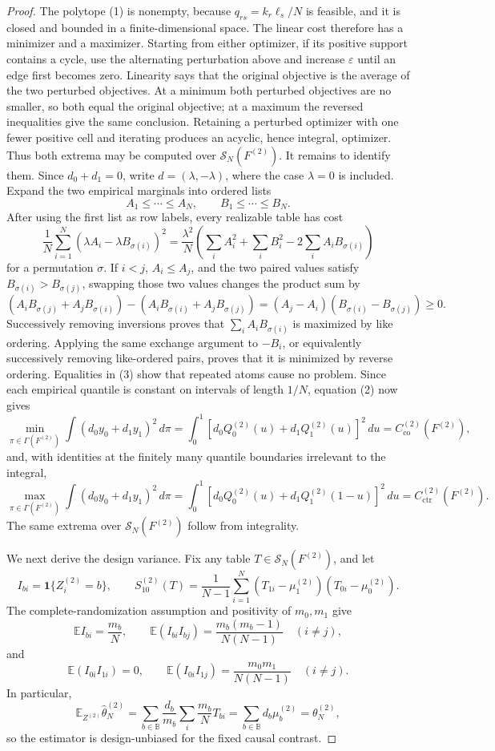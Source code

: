 \documentclass{article}
\begin{document}
\begin{proof}
The polytope (1) is nonempty, because \(q_{rs}=k_r\ell_s/N\) is feasible, and it is closed and bounded in a finite-dimensional space.  The linear cost therefore has a minimizer and a maximizer.  Starting from either optimizer, if its positive support contains a cycle, use the alternating perturbation above and increase \(\varepsilon\) until an edge first becomes zero.  Linearity says that the original objective is the average of the two perturbed objectives.  At a minimum both perturbed objectives are no smaller, so both equal the original objective; at a maximum the reversed inequalities give the same conclusion.  Retaining a perturbed optimizer with one fewer positive cell and iterating produces an acyclic, hence integral, optimizer.  Thus both extrema may be computed over \(\mathcal S_N(F^{(2)})\).  It remains to identify them.  Since \(d_0+d_1=0\), write \(d=(\lambda,-\lambda)\), where the case \(\lambda=0\) is included.  Expand the two empirical marginals into ordered lists
\[
A_1\leq\cdots\leq A_N,\qquad B_1\leq\cdots\leq B_N.
\]
After using the first list as row labels, every realizable table has cost
\[
\frac1N\sum_{i=1}^N(\lambda A_i-\lambda B_{\sigma(i)})^2
=\frac{\lambda^2}{N}\left(\sum_i A_i^2+\sum_iB_i^2-2\sum_iA_iB_{\sigma(i)}\right) \tag{2}
\]
for a permutation \(\sigma\).  If \(i<j\), \(A_i\leq A_j\), and the two paired values satisfy \(B_{\sigma(i)}>B_{\sigma(j)}\), swapping those two values changes the product sum by
\[
(A_iB_{\sigma(j)}+A_jB_{\sigma(i)})
 -(A_iB_{\sigma(i)}+A_jB_{\sigma(j)})
=(A_j-A_i)(B_{\sigma(i)}-B_{\sigma(j)})\geq0. \tag{3}
\]
Successively removing inversions proves that \(\sum_iA_iB_{\sigma(i)}\) is maximized by like ordering.  Applying the same exchange argument to \(-B_i\), or equivalently successively removing like-ordered pairs, proves that it is minimized by reverse ordering.  Equalities in (3) show that repeated atoms cause no problem.  Since each empirical quantile is constant on intervals of length \(1/N\), equation (2) now gives
\[
\min_{\pi\in\Gamma(F^{(2)})}\int(d_0y_0+d_1y_1)^2\,d\pi
=\int_0^1[d_0Q_0^{(2)}(u)+d_1Q_1^{(2)}(u)]^2\,du
=C_{\mathrm{co}}^{(2)}(F^{(2)}), \tag{4}
\]
and, with identities at the finitely many quantile boundaries irrelevant to the integral,
\[
\max_{\pi\in\Gamma(F^{(2)})}\int(d_0y_0+d_1y_1)^2\,d\pi
=\int_0^1[d_0Q_0^{(2)}(u)+d_1Q_1^{(2)}(1-u)]^2\,du
=C_{\mathrm{ctr}}^{(2)}(F^{(2)}). \tag{5}
\]
The same extrema over \(\mathcal S_N(F^{(2)})\) follow from integrality.

We next derive the design variance.  Fix any table \(T\in\mathcal S_N(F^{(2)})\), and let
\[
I_{bi}=\mathbf 1\{Z_i^{(2)}=b\},\qquad
S_{10}^{(2)}(T)=\frac1{N-1}\sum_{i=1}^N(T_{1i}-\mu_1^{(2)})(T_{0i}-\mu_0^{(2)}).
\]
The complete-randomization assumption and positivity of \(m_0,m_1\) give
\[
\mathbb E I_{bi}=\frac{m_b}{N},\qquad
\mathbb E(I_{bi}I_{bj})=\frac{m_b(m_b-1)}{N(N-1)}\quad(i\ne j), \tag{6}
\]
and
\[
\mathbb E(I_{0i}I_{1i})=0,\qquad
\mathbb E(I_{0i}I_{1j})=\frac{m_0m_1}{N(N-1)}\quad(i\ne j). \tag{7}
\]
In particular,
\[
\mathbb E_{Z^{(2)}}\widehat\theta_N^{(2)}
=\sum_{b\in\mathbb B}\frac{d_b}{m_b}\sum_i\frac{m_b}{N}T_{bi}
=\sum_{b\in\mathbb B}d_b\mu_b^{(2)}
=\theta_N^{(2)}, \tag{8}
\]
so the estimator is design-unbiased for the fixed causal contrast.


\end{proof}
\end{document}
